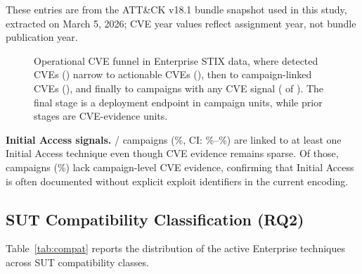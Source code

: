 \documentclass[sigconf,anonymous,review]{acmart}
\newcommand{\myparagraph}[1]{\textbf{#1.}\hspace{0.5em}}
\begin{document}
These entries are from the ATT\&CK v18.1 bundle snapshot used in this study, extracted on March 5, 2026; CVE year values reflect assignment year, not bundle publication year.

\begin{figure}[!tb]
\centering
\resizebox{\columnwidth}{!}{}
\caption{Operational CVE funnel in Enterprise STIX data, where detected CVEs (\cveuniquecount{}) narrow to actionable CVEs (\cveactionablecount{}), then to campaign-linked CVEs (\campaignlinkedcvecount{}), and finally to campaigns with any CVE signal (\entcampaignswithcvecount{} of \enterpriseactivecampaigncount{}). The final stage is a deployment endpoint in campaign units, while prior stages are CVE-evidence units.}\label{fig:cve_location}
\end{figure}

\myparagraph{Initial Access signals}
\campaignswithinitialaccesscount{}/\enterpriseactivecampaigncount{} campaigns (\campaignswithinitialaccesspct\%, CI: \campaignswithinitialaccesscilow{}\%--\campaignswithinitialaccesscihigh{}\%) are linked to at least one Initial Access technique even though CVE evidence remains sparse. Of those, \campaignswithinitialaccessnocvecount{} campaigns (\campaignswithinitialaccessnocvepct\%) lack campaign-level CVE evidence, confirming that Initial Access is often documented without explicit exploit identifiers in the current encoding.

\subsection{SUT Compatibility Classification (RQ2)}

Table~\ref{tab:compat} reports the distribution of the \enterpriseplatformcount{} active Enterprise techniques across SUT compatibility classes.
\end{document}
